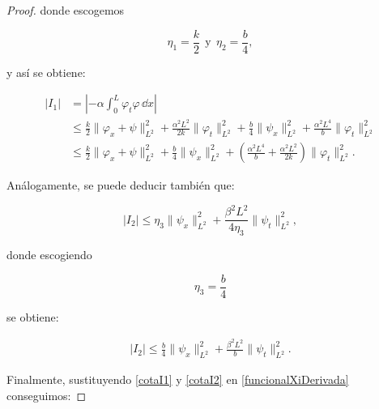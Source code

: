 \begin{proof}
    donde escogemos

    \[\eta_1 = \frac{k}{2} \ \ \text{y} \ \ \eta_2 = \frac{b}{4},\]

    y así se obtiene:

    \begin{align}
        \label{cotaI1}
        \lvert I_1 \rvert &= \left\lvert-\alpha\int_0^L\varphi_t\varphi \, \dd x\right\lvert\\
        &\leq \frac{k}{2}\lVert \varphi_x + \psi\rVert^2_{L^2} + \frac{\alpha^2 L^2}{2k}\lVert\varphi_t\rVert^2_{L^2}  + \frac{b}{4}\lVert \psi_x \rVert^2_{L^2} + \frac{\alpha^2 L^4}{b}\lVert\varphi_t\rVert^2_{L^2}\\
        &\leq \frac{k}{2}\lVert \varphi_x + \psi\rVert^2_{L^2} + \frac{b}{4}\lVert \psi_x \rVert^2_{L^2} + \left(\frac{\alpha^2 L^4}{b} + \frac{\alpha^2 L^2}{2k}\right)\lVert\varphi_t\rVert^2_{L^2}.
    \end{align}

    Análogamente, se puede deducir también que:

    \[\lvert I_2 \lvert \leq \eta_3 \lVert \psi_x\rVert^2_{L^2} + \frac{\beta^2L^2}{4\eta_3}\lVert \psi_t \rVert^2_{L^2},\]

    donde escogiendo

    \[\eta_3 = \frac{b}{4}\]

    se obtiene:

    \begin{align}
        \label{cotaI2}
        \lvert I_2 \lvert \leq \frac{b}{4} \lVert \psi_x\rVert^2_{L^2} + \frac{\beta^2L^2}{b}\lVert \psi_t \rVert^2_{L^2}.
    \end{align}

    Finalmente, sustituyendo \eqref{cotaI1} y \eqref{cotaI2} en \eqref{funcionalXiDerivada} conseguimos:


\end{proof}
